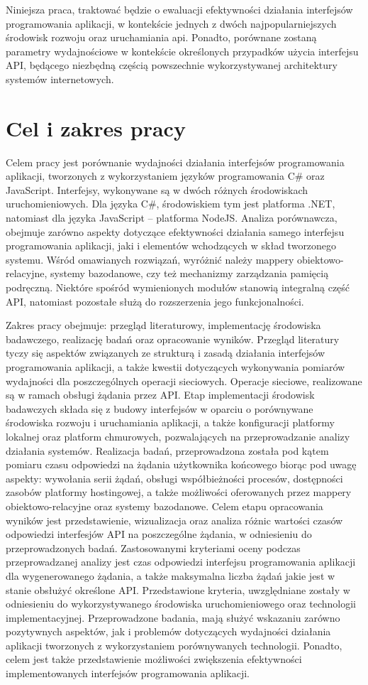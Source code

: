 Niniejsza praca, traktować będzie o ewaluacji efektywności działania interfejsów programowania aplikacji, w kontekście jednych z dwóch najpopularniejszych środowisk rozwoju oraz uruchamiania api. Ponadto, porównane zostaną parametry wydajnościowe w kontekście określonych przypadków użycia interfejsu API, będącego niezbędną częścią powszechnie wykorzystywanej architektury systemów internetowych.
\section{Cel i zakres pracy}
Celem pracy jest porównanie wydajności działania interfejsów programowania aplikacji, tworzonych z wykorzystaniem języków programowania C\# oraz JavaScript. Interfejsy, wykonywane są w dwóch różnych środowiskach uruchomieniowych. Dla języka C\#, środowiskiem tym jest platforma .NET, natomiast dla języka JavaScript -- platforma NodeJS. Analiza porównawcza, obejmuje zarówno aspekty dotyczące efektywności działania samego interfejsu programowania aplikacji, jaki i elementów wchodzących w skład tworzonego systemu. Wśród omawianych rozwiązań, wyróżnić należy mappery obiektowo-relacyjne, systemy bazodanowe, czy też mechanizmy zarządzania pamięcią podręczną. Niektóre spośród wymienionych modułów stanowią integralną część API, natomiast pozostałe służą do rozszerzenia jego funkcjonalności.

Zakres pracy obejmuje: przegląd literaturowy, implementację środowiska badawczego, realizację badań oraz opracowanie wyników. Przegląd literatury tyczy się aspektów związanych ze strukturą i zasadą działania interfejsów programowania aplikacji, a także kwestii dotyczących wykonywania pomiarów wydajności dla poszczególnych operacji sieciowych. Operacje sieciowe, realizowane są w ramach obsługi żądania przez API. Etap implementacji środowisk badawczych składa się z budowy interfejsów w oparciu o porównywane środowiska rozwoju i uruchamiania aplikacji, a także konfiguracji platformy lokalnej oraz platform chmurowych, pozwalających na przeprowadzanie analizy działania systemów. Realizacja badań, przeprowadzona została pod kątem pomiaru czasu odpowiedzi na żądania użytkownika końcowego biorąc pod uwagę aspekty: wywołania serii żądań, obsługi współbieżności procesów, dostępności zasobów platformy hostingowej, a także możliwości oferowanych przez mappery obiektowo-relacyjne oraz systemy bazodanowe. Celem etapu opracowania wyników jest przedstawienie, wizualizacja oraz analiza różnic wartości czasów odpowiedzi interfesjów API na poszczególne żądania, w odniesieniu do przeprowadzonych badań. Zastosowanymi kryteriami oceny podczas przeprowadzanej analizy jest czas odpowiedzi interfejsu programowania aplikacji dla wygenerowanego żądania, a także maksymalna liczba żądań jakie jest w stanie obsłużyć określone API. Przedstawione kryteria, uwzględniane zostały w odniesieniu do wykorzystywanego środowiska uruchomieniowego oraz technologii implementacyjnej. Przeprowadzone badania, mają służyć wskazaniu zarówno pozytywnych aspektów, jak i problemów dotyczących wydajności działania aplikacji tworzonych z wykorzystaniem porównywanych technologii. Ponadto, celem jest także przedstawienie możliwości zwiększenia efektywności implementowanych interfejsów programowania aplikacji.
